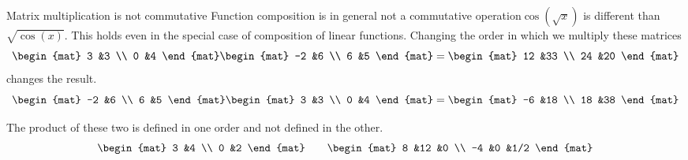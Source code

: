 \documentclass[9pt,t]{beamer}
\begin{document}
\begin{frame}{Matrix multiplication is not commutative}
Function composition is in general not a commutative 
operation\Dash $\cos(\sqrt{x})$
is different than $\sqrt{\cos(x)}$.
This holds even in the special case of 
composition of linear functions.
\pause
\ex
Changing the order in which we multiply these matrices
\begin{equation*}
  \begin{mat}
    3  &3  \\
    0  &4
  \end{mat}
  \begin{mat}
    -2  &6  \\
    6   &5
  \end{mat}
  =
  \begin{mat}
    12  &33 \\
    24  &20
  \end{mat}
\end{equation*}
changes the result.
\begin{equation*}
  \begin{mat}
    -2  &6  \\
    6   &5
  \end{mat}
  \begin{mat}
    3  &3  \\
    0  &4
  \end{mat}
  =
  \begin{mat}
     -6  &18   \\
     18  &38  
  \end{mat}
\end{equation*}

\ex
The product of these two
is defined in one order
and not defined in the other.
\begin{equation*}
  \begin{mat}
    3  &4  \\
    0  &2
  \end{mat}
  \qquad
  \begin{mat}
    8  &12  &0 \\
   -4  &0  &1/2
  \end{mat}
\end{equation*}
\end{frame}
\end{document}
